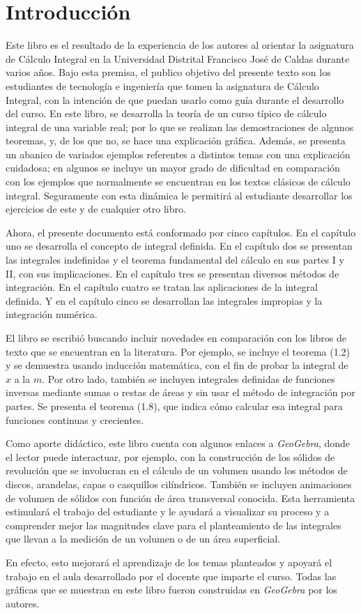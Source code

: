 \chapter*{Introducción}

Este libro es el resultado de la experiencia de los autores al orientar la asignatura de Cálculo Integral en la Universidad Distrital Francisco José de Caldas durante varios años. Bajo esta premisa, el publico objetivo del presente texto son los estudiantes de tecnología e ingeniería que tomen la asignatura de Cálculo Integral, con la intención de que puedan usarlo como guía durante el desarrollo del curso.
En este libro, se desarrolla la teoría de un curso típico de cálculo integral de una variable real; por lo que se realizan las demostraciones de algunos teoremas, y, de los que no, se hace una explicación gráfica. Además, se presenta un abanico de variados ejemplos referentes a distintos temas con una explicación cuidadosa; en algunos se incluye un mayor grado de dificultad en comparación con los ejemplos que normalmente se encuentran en los textos clásicos de cálculo integral. Seguramente con esta dinámica le permitirá al estudiante desarrollar los ejercicios de este y de cualquier otro libro.

Ahora, el presente documento está conformado por cinco capítulos. En el capítulo uno se desarrolla el concepto de integral definida. En el capítulo dos se presentan las integrales indefinidas y el teorema fundamental del cálculo en sus partes I y II, con sus implicaciones. En el capítulo tres se presentan diversos métodos de integración. En el capítulo cuatro se tratan las aplicaciones de la integral definida. Y en el capítulo cinco se desarrollan las integrales impropias y la integración numérica.

El libro se escribió buscando incluir novedades en comparación con los libros de texto que se encuentran en la literatura. Por ejemplo, se incluye el teorema (1.2) y se demuestra usando inducción matemática, con el fin de probar la integral de $x$ a la $m$.
Por otro lado, también se incluyen integrales definidas de funciones inversas mediante sumas o restas de áreas y sin usar el método de integración por partes. Se presenta el teorema (1.8), que indica cómo calcular esa integral para funciones continuas y crecientes.

Como aporte didáctico, este libro cuenta con algunos enlaces a \textit{GeoGebra}, donde el lector puede interactuar, por ejemplo, con la construcción de los sólidos de revolución que se involucran en el cálculo de un volumen usando los métodos de discos, arandelas, capas o casquillos cilíndricos. También se incluyen animaciones de volumen de sólidos con función de área transversal conocida. Esta herramienta estimulará el trabajo del estudiante y le ayudará a visualizar su proceso y a comprender mejor las magnitudes clave para el planteamiento de las integrales que llevan a la medición de un volumen o de un área superficial. 

En efecto, esto mejorará el aprendizaje de los temas planteados y apoyará el trabajo en el aula desarrollado por el docente que imparte el curso. Todas las gráficas que se muestran en este libro fueron construidas en \textit{GeoGebra} por los autores.
